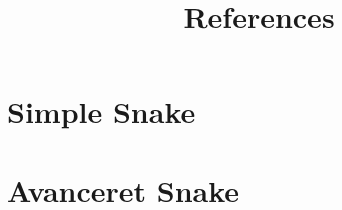 \documentclass[10pt,a4paper,oneside]{report}
\begin{document}
\graphicspath{{pics/}}

\newpage
\newpage

\chapter{Simple Snake}
\newpage
\newpage
\newpage
\newpage

\chapter{Avanceret Snake}
\newpage
\newpage
\newpage
\newpage

\newpage

\appendix

\newpage

\title{References}


\end{document}
